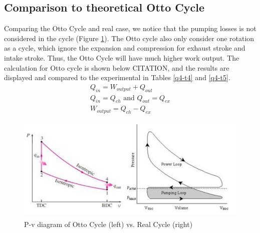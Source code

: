 \documentclass[11pt]{article}
\begin{document}
\subsection*{Comparison to theoretical Otto Cycle}
Comparing the Otto Cycle and real case, we notice that the pumping losses is not considered in the cycle (Figure \ref{q4-f5}). The Otto cycle also only consider one rotation as a cycle, which ignore the expansion and compression for exhaust stroke and intake stroke. Thus, the Otto Cycle will have much higher work output. The calculation for Otto cycle is shown below CITATION, and the results are displayed and compared to the experimental in Tables \ref{q4-t4} and \ref{q4-t5}.
\begin{eqnarray}
Q_{in} = W_{output} + Q_{out}\\
Q_{in} = Q_{ch} \textrm{ and } Q_{out} = Q_{ex}\\
W_{output} = Q_{ch} - Q_{ex}
\end{eqnarray}
\begin{figure}[H]
	\centering
    \includegraphics[height = 5cm]{./img/diagram20.png}
    \caption{P-v diagram of Otto Cycle (left) vs. Real Cycle (right)}
    \label{q4-f5}
\end{figure}
\end{document}
